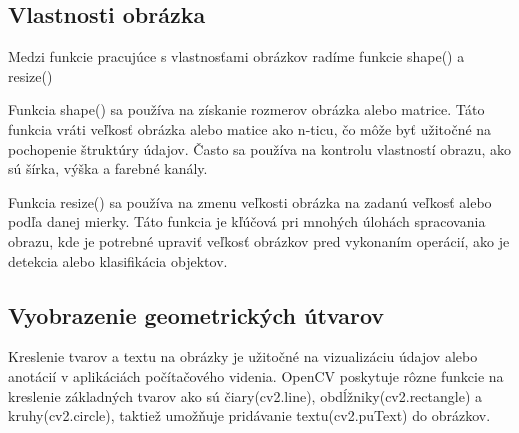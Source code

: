 \subsection{Vlastnosti obrázka}
Medzi funkcie pracujúce s vlastnosťami obrázkov radíme funkcie shape() a resize()

Funkcia shape() sa používa na získanie rozmerov obrázka alebo matrice. Táto funkcia vráti veľkosť obrázka alebo 
matice ako n-ticu, čo môže byť užitočné na pochopenie štruktúry údajov. Často sa používa na kontrolu vlastností 
obrazu, ako sú šírka, výška a farebné kanály.

Funkcia resize() sa používa na zmenu veľkosti obrázka na zadanú veľkosť alebo podľa danej mierky. Táto funkcia 
je kľúčová pri mnohých úlohách spracovania obrazu, kde je potrebné upraviť veľkosť obrázkov pred vykonaním operácií, 
ako je detekcia alebo klasifikácia objektov.

\subsection{Vyobrazenie geometrických útvarov}
Kreslenie tvarov a textu na obrázky je užitočné na vizualizáciu údajov alebo anotácií v aplikáciách počítačového 
videnia. OpenCV poskytuje rôzne funkcie na kreslenie základných tvarov ako sú čiary(cv2.line), obdĺžniky(cv2.rectangle) 
a kruhy(cv2.circle), taktiež umožňuje pridávanie textu(cv2.puText) do obrázkov.

